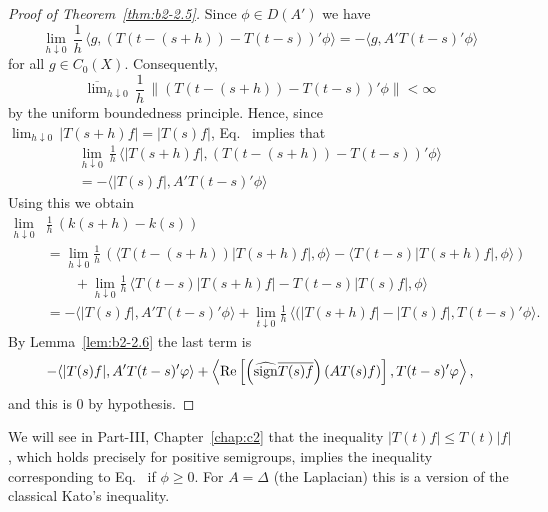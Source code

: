 \begin{proof}[Proof of Theorem~\ref{thm:b2-2.5}]
Since $\phi \in D(A')$ we have
\begin{equation}\label{eq:b2-2.14}
\lim_{h \downarrow 0}\, \frac{1}{h}\, \langle g,(T(t-(s+h)) - T(t-s))'\phi \rangle = - \langle g,A'T(t-s)'\phi \rangle
\end{equation}
for all $g \in C_{0}(X)$.
Consequently,
\begin{equation*}
\overline{\lim}_{h \downarrow 0}\, \frac{1}{h}\, \|(T(t-(s+h)) - T(t-s))'\phi\| < \infty
\end{equation*}
by the uniform boundedness principle.
Hence, since $\lim_{h \downarrow 0}\, |T(s+h)f| = |T(s)f|$, Eq.~ implies that
\begin{equation}\label{eq:b2-2.15}
\begin{split}
\lim_{h \downarrow 0}\, \frac{1}{h}\, \langle |T(s+h)f|,(T(t-(s+h)) - T(t-s))'\phi \rangle \\
= - \langle |T(s)f|,A'T(t-s)'\phi \rangle
\end{split}
\end{equation}
Using this we obtain
\begin{align*}
\lim_{h \downarrow 0} & \frac{1}{h}\, (k(s+h) - k(s)) \\
&= \lim_{h \downarrow 0}  \frac{1}{h}\, (\langle T(t-(s+h))|T(s+h)f|,\phi \rangle - \langle T(t-s)|T(s+h)f|,\phi \rangle) \\
&\qquad + \lim_{h \downarrow 0}  \frac{1}{h}\, \langle T(t-s)|T(s+h)f| - T(t-s)|T(s)f|,\phi \rangle \\
&= -\langle |T(s)f|,A'T(t-s)'\phi \rangle + \lim_{t \downarrow 0}  \frac{1}{h} \, \langle (|T(s+h)f| -  |T(s)f| , T(t-s)'\phi \rangle .
\end{align*}
By Lemma~\ref{lem:b2-2.6} the last term is
\begin{align*}
- \langle |T(s)f|,A'T(t-s)'\phi \rangle + \left\langle \Re\left[\left(\widehat{\sign} \overline{T(s)f}\right)(AT(s)f)\right],T(t-s)'\phi \right\rangle,
\end{align*}
and this is $0$ by hypothesis.
\end{proof}
\begin{remark}\label{rem:b2-2.7}
We will see in Part-III, Chapter~\ref{chap:c2} that the inequality $|T(t)f| \leq T(t)|f|$, which holds precisely for positive semigroups, implies the inequality corresponding to Eq.~
if\/ $\phi \geq 0$.
For $A = \Delta$ (the Laplacian) this is a version of the classical Kato's inequality.
\end{remark}
